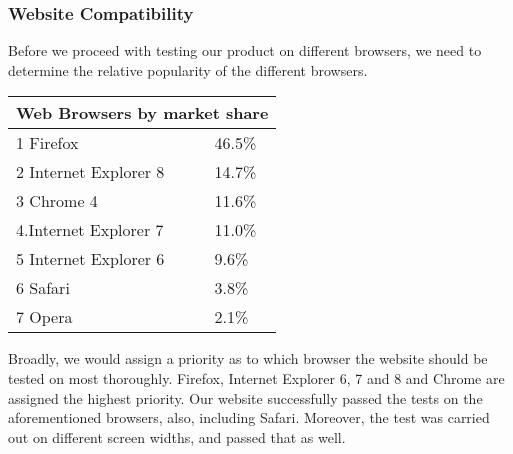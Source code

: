 \subsubsection{Website Compatibility}

Before we proceed with testing our product on different browsers, we need to determine the relative popularity of the different browsers.

\begin{tabular}{|l|l|}
\hline
\multicolumn{2}{|c|}{Web Browsers by market share} \\
\hline
1 Firefox & 46.5\% \\
2 Internet Explorer 8 & 14.7\% \\
3 Chrome 4 & 11.6\% \\
4.Internet Explorer 7 & 11.0\% \\
5 Internet Explorer 6 & 9.6\% \\
6 Safari & 3.8\% \\
7 Opera & 2.1\% \\
\hline
\end{tabular}
\newline{}
\newline{}

Broadly, we would assign a priority as to which browser the website should be tested on most thoroughly. Firefox, Internet Explorer 6, 7 and 8 and Chrome are assigned the highest priority. Our website successfully passed the tests on the aforementioned browsers, also, including Safari. Moreover, the test was carried out on different screen widths, and passed that as well.

